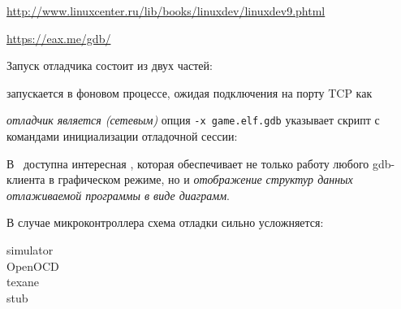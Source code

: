 \url{http://www.linuxcenter.ru/lib/books/linuxdev/linuxdev9.phtml}

\url{https://eax.me/gdb/}

\medskip\noindent
Запуск отладчика состоит из двух частей:
\begin{description}[nosep]
\item[qemu] запускается в фоновом процессе, ожидая подключения на порту TCP
 как 
\item[gdb] \emph{отладчик является (сетевым) }
опция \verb|-x game.elf.gdb| указывает скрипт с командами инициализации
отладочной сессии:
\end{description}

\clearpage
{}

В \linux\ доступна интересная  , которая
обеспечивает не только работу любого gdb-клиента в графическом режиме, но и
\emph{отображение структур данных отлаживаемой программы в виде диаграмм}.


\clearpage
{}
\clearpage
{}
\clearpage
{}

\clearpage
{}

В случае микроконтроллера схема отладки сильно усложняется:
\bigskip

\clearpage

\begin{description}
\item[simulator]
\item[OpenOCD]
\item[texane]
\item[stub]
\end{description}

\secup
